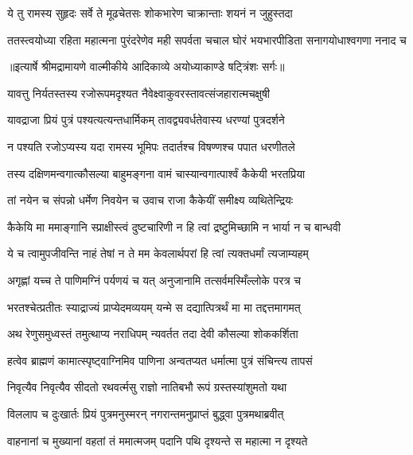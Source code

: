 \twolineshloka
{ये तु रामस्य सुहृदः सर्वे ते मूढचेतसः}
{शोकभारेण चाक्रान्ताः शयनं न जुहुस्तदा} %

\fourlineindentedshloka
{ततस्त्वयोध्या रहिता महात्मना}
{ पुरंदरेणेव मही सपर्वता}
{चचाल घोरं भयभारपीडिता}
{ सनागयोधाश्वगणा ननाद च} %


{॥इत्यार्षे श्रीमद्रामायणे वाल्मीकीये आदिकाव्ये अयोध्याकाण्डे षट्त्रिंशः सर्गः॥}


\twolineshloka
{यावत्तु निर्यतस्तस्य रजोरूपमदृश्यत}
{नैवेक्ष्वाकुवरस्तावत्संजहारात्मचक्षुषी} %

\twolineshloka
{यावद्राजा प्रियं पुत्रं पश्यत्यत्यन्तधार्मिकम्}
{तावद्व्यवर्धतेवास्य धरण्यां पुत्रदर्शने} %

\twolineshloka
{न पश्यति रजोऽप्यस्य यदा रामस्य भूमिपः}
{तदार्तश्च विषण्णश्च पपात धरणीतले} %

\twolineshloka
{तस्य दक्षिणमन्वगात्कौसल्या बाहुमङ्गना}
{वामं चास्यान्वगात्पार्श्वं कैकेयी भरतप्रिया} %

\twolineshloka
{तां नयेन च संपन्नो धर्मेण निवयेन च}
{उवाच राजा कैकेयीं समीक्ष्य व्यथितेन्द्रियः} %

\twolineshloka
{कैकेयि मा ममाङ्गानि स्प्राक्षीस्त्वं दुष्टचारिणी}
{न हि त्वां द्रष्टुमिच्छामि न भार्या न च बान्धवी} %

\twolineshloka
{ये च त्वामुपजीवन्ति नाहं तेषां न ते मम}
{केवलार्थपरां हि त्वां त्यक्तधर्मां त्यजाम्यहम्} %

\twolineshloka
{अगृह्णां यच्च ते पाणिमग्निं पर्यणयं च यत्}
{अनुजानामि तत्सर्वमस्मिँल्लोके परत्र च} %

\twolineshloka
{भरतश्चेत्प्रतीतः स्याद्राज्यं प्राप्येदमव्ययम्}
{यन्मे स दद्यात्पित्रर्थं मा मा तद्दत्तमागमत्} %

\twolineshloka
{अथ रेणुसमुध्वस्तं तमुत्थाप्य नराधिपम्}
{न्यवर्तत तदा देवी कौसल्या शोककर्शिता} %

\twolineshloka
{हत्वेव ब्राह्मणं कामात्स्पृष्ट्वाग्निमिव पाणिना}
{अन्वतप्यत धर्मात्मा पुत्रं संचिन्त्य तापसं} %

\twolineshloka
{निवृत्यैव निवृत्यैव सीदतो रथवर्त्मसु}
{राज्ञो नातिबभौ रूपं ग्रस्तस्यांशुमतो यथा} %

\twolineshloka
{विललाप च दुःखार्तः प्रियं पुत्रमनुस्मरन्}
{नगरान्तमनुप्राप्तं बुद्ध्वा पुत्रमथाब्रवीत्} %

\twolineshloka
{वाहनानां च मुख्यानां वहतां तं ममात्मजम्}
{पदानि पथि दृश्यन्ते स महात्मा न दृश्यते} %

